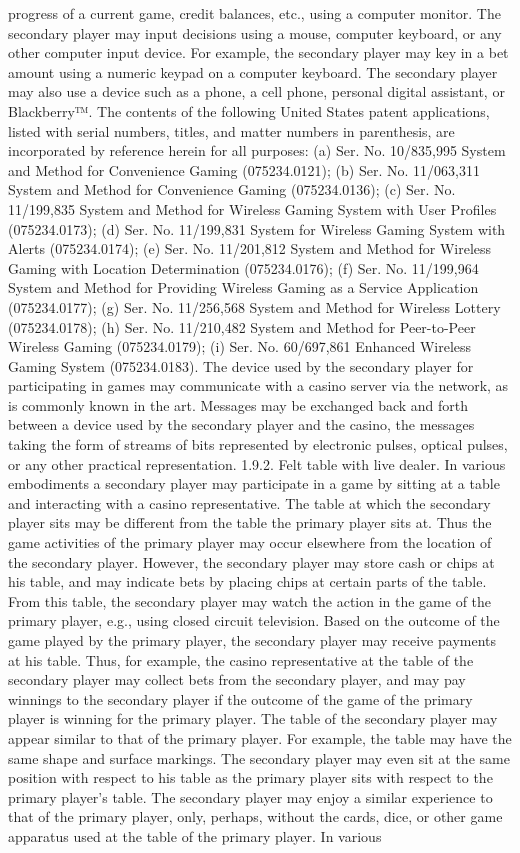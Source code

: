 \documentclass[11pt,a4paper]{article}
\begin{document}
progress of a current game, credit balances, etc., using a computer monitor. The secondary player may input decisions using a mouse, computer keyboard, or any other computer input device. For example, the secondary player may key in a bet amount using a numeric keypad on a computer keyboard. The secondary player may also use a device such as a phone, a cell phone, personal digital assistant, or Blackberry™. The contents of the following United States patent applications, listed with serial numbers, titles, and matter numbers in parenthesis, are incorporated by reference herein for all purposes: (a) Ser. No. 10/835,995 System and Method for Convenience Gaming (075234.0121); (b) Ser. No. 11/063,311 System and Method for Convenience Gaming (075234.0136); (c) Ser. No. 11/199,835 System and Method for Wireless Gaming System with User Profiles (075234.0173); (d) Ser. No. 11/199,831 System for Wireless Gaming System with Alerts (075234.0174); (e) Ser. No. 11/201,812 System and Method for Wireless Gaming with Location Determination (075234.0176); (f) Ser. No. 11/199,964 System and Method for Providing Wireless Gaming as a Service Application (075234.0177); (g) Ser. No. 11/256,568 System and Method for Wireless Lottery (075234.0178); (h) Ser. No. 11/210,482 System and Method for Peer-to-Peer Wireless Gaming (075234.0179); (i) Ser. No. 60/697,861 Enhanced Wireless Gaming System (075234.0183). The device used by the secondary player for participating in games may communicate with a casino server via the network, as is commonly known in the art. Messages may be exchanged back and forth between a device used by the secondary player and the casino, the messages taking the form of streams of bits represented by electronic pulses, optical pulses, or any other practical representation. 1.9.2. Felt table with live dealer. In various embodiments a secondary player may participate in a game by sitting at a table and interacting with a casino representative. The table at which the secondary player sits may be different from the table the primary player sits at. Thus the game activities of the primary player may occur elsewhere from the location of the secondary player. However, the secondary player may store cash or chips at his table, and may indicate bets by placing chips at certain parts of the table. From this table, the secondary player may watch the action in the game of the primary player, e.g., using closed circuit television. Based on the outcome of the game played by the primary player, the secondary player may receive payments at his table. Thus, for example, the casino representative at the table of the secondary player may collect bets from the secondary player, and may pay winnings to the secondary player if the outcome of the game of the primary player is winning for the primary player. The table of the secondary player may appear similar to that of the primary player. For example, the table may have the same shape and surface markings. The secondary player may even sit at the same position with respect to his table as the primary player sits with respect to the primary player's table. The secondary player may enjoy a similar experience to that of the primary player, only, perhaps, without the cards, dice, or other game apparatus used at the table of the primary player. In various 
\end{document}
